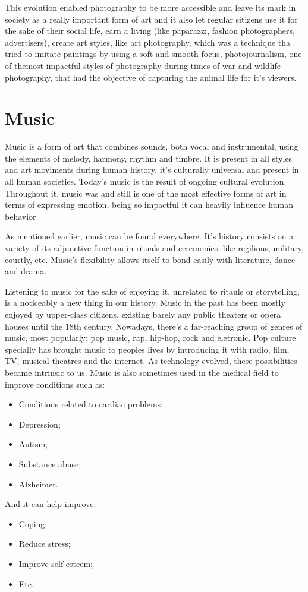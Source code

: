 \documentclass{report}
\begin{document}
This evolution enabled photography to be more accessible and leave its mark in society as a really important form of art and it also let regular sitizens use it for the sake of their social life, earn a living (like paparazzi, fashion photographers, advertisers), create art styles, like art photography, which was a technique tha tried to imitate paintings by using a soft and smooth focus, photojournalism, one of themost impactful styles of photography during times of war and wildlife photography, that had the objective of capturing the animal life for it's viewers.

\section{Music}
	
Music is a form of art that combines sounds, both vocal and instrumental, using the elements of melody, harmony, rhythm and timbre. It is present in all styles and art moviments during human history, it's culturally universal and present in all human societies. Today's music is the result of ongoing cultural evolution. Throughout it, music was and still is one of the most effective forms of art in terms of expressing emotion, being so impactful it can heavily influence human behavior.
	
As mentioned earlier, music can be found everywhere. It's history consists on a variety of its adjunctive function in rituals and ceremonies, like regilious, military, courtly, etc. Music's flexibility allows itself to bond easily with literature, dance and drama.

Listening to music for the sake of enjoying it, unrelated to ritauls or storytelling,  is a noticeably a new thing in our history. 
Music in the past has been mostly enjoyed by upper-class citizens, existing barely any public theaters or opera houses until the 18th century. Nowadays, there's a far-reaching group of genres of music, most popularly: pop music, rap, hip-hop, rock and eletronic. Pop culture specially has brought music to peoples lives by introducing it with radio, film, TV, musical theatres and the internet. As technology evolved, these possibilities became intrinsic to us. Music is also sometimes used in the medical field to improve conditions such as:
\begin{itemize}
 \item{Conditions related to cardiac problems;}
 \item{Depression;}
 \item{Autism;}
 \item{Substance abuse;}
 \item{Alzheimer.}
\end{itemize}
And it can help improve:
\begin{itemize}
 \item{Coping;}
 \item{Reduce stress;}
 \item{Improve self-esteem;}
 \item{Etc.}
\end{itemize}
\end{document}

